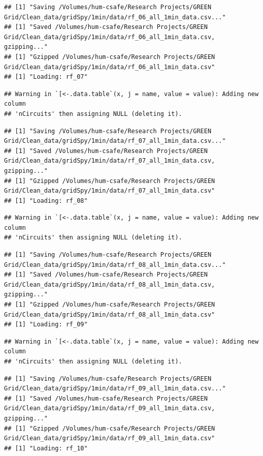\documentclass[]{article}
\begin{document}
\begin{verbatim}
## [1] "Saving /Volumes/hum-csafe/Research Projects/GREEN Grid/Clean_data/gridSpy/1min/data/rf_06_all_1min_data.csv..."
## [1] "Saved /Volumes/hum-csafe/Research Projects/GREEN Grid/Clean_data/gridSpy/1min/data/rf_06_all_1min_data.csv, gzipping..."
## [1] "Gzipped /Volumes/hum-csafe/Research Projects/GREEN Grid/Clean_data/gridSpy/1min/data/rf_06_all_1min_data.csv"
## [1] "Loading: rf_07"
\end{verbatim}

\begin{verbatim}
## Warning in `[<-.data.table`(x, j = name, value = value): Adding new column
## 'nCircuits' then assigning NULL (deleting it).
\end{verbatim}

\begin{verbatim}
## [1] "Saving /Volumes/hum-csafe/Research Projects/GREEN Grid/Clean_data/gridSpy/1min/data/rf_07_all_1min_data.csv..."
## [1] "Saved /Volumes/hum-csafe/Research Projects/GREEN Grid/Clean_data/gridSpy/1min/data/rf_07_all_1min_data.csv, gzipping..."
## [1] "Gzipped /Volumes/hum-csafe/Research Projects/GREEN Grid/Clean_data/gridSpy/1min/data/rf_07_all_1min_data.csv"
## [1] "Loading: rf_08"
\end{verbatim}

\begin{verbatim}
## Warning in `[<-.data.table`(x, j = name, value = value): Adding new column
## 'nCircuits' then assigning NULL (deleting it).
\end{verbatim}

\begin{verbatim}
## [1] "Saving /Volumes/hum-csafe/Research Projects/GREEN Grid/Clean_data/gridSpy/1min/data/rf_08_all_1min_data.csv..."
## [1] "Saved /Volumes/hum-csafe/Research Projects/GREEN Grid/Clean_data/gridSpy/1min/data/rf_08_all_1min_data.csv, gzipping..."
## [1] "Gzipped /Volumes/hum-csafe/Research Projects/GREEN Grid/Clean_data/gridSpy/1min/data/rf_08_all_1min_data.csv"
## [1] "Loading: rf_09"
\end{verbatim}

\begin{verbatim}
## Warning in `[<-.data.table`(x, j = name, value = value): Adding new column
## 'nCircuits' then assigning NULL (deleting it).
\end{verbatim}

\begin{verbatim}
## [1] "Saving /Volumes/hum-csafe/Research Projects/GREEN Grid/Clean_data/gridSpy/1min/data/rf_09_all_1min_data.csv..."
## [1] "Saved /Volumes/hum-csafe/Research Projects/GREEN Grid/Clean_data/gridSpy/1min/data/rf_09_all_1min_data.csv, gzipping..."
## [1] "Gzipped /Volumes/hum-csafe/Research Projects/GREEN Grid/Clean_data/gridSpy/1min/data/rf_09_all_1min_data.csv"
## [1] "Loading: rf_10"
\end{verbatim}
\end{document}
